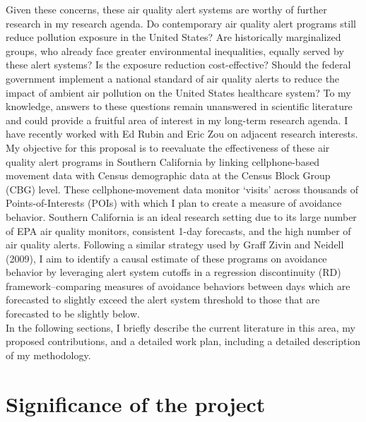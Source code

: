 \documentclass[12pt]{article}
\begin{document}
Given these concerns, these air quality alert systems are worthy of further research in my research agenda. Do contemporary air quality alert programs still reduce pollution exposure in the United States? Are historically marginalized groups, who already face greater environmental inequalities, equally served by these alert systems? Is the exposure reduction cost-effective? Should the federal government implement a national standard of air quality alerts to reduce the impact of ambient air pollution on the United States healthcare system? To my knowledge, answers to these questions remain unanswered in scientific literature and could provide a fruitful area of interest in my long-term research agenda. I have recently worked with Ed Rubin and Eric Zou on adjacent research interests. \\

My objective for this proposal is to reevaluate the effectiveness of these air quality alert programs in Southern California by linking cellphone-based movement data with Census demographic data at the Census Block Group (CBG) level. These cellphone-movement data monitor `visits' across thousands of Points-of-Interests (POIs) with which I plan to create a measure of avoidance behavior. Southern California is an ideal research setting due to its large number of EPA air quality monitors, consistent 1-day forecasts, and the high number of air quality alerts. Following a similar strategy used by Graff Zivin and Neidell (2009), I aim to identify a causal estimate of these programs on avoidance behavior by leveraging alert system cutoffs in a regression discontinuity (RD) framework--comparing measures of avoidance behaviors between days which are forecasted to slightly exceed the alert system threshold to those that are forecasted to be slightly below. \\


In the following sections, I briefly describe the current literature in this area, my proposed contributions, and a detailed work plan, including a detailed description of my methodology.

\section{Significance of the project}
\end{document}
